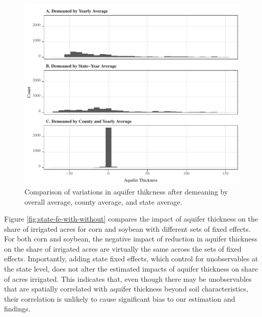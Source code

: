 \documentclass[
]{article}
\begin{document}
\begin{figure}[H]

{\centering \includegraphics[width=6in,]{Figures/g_variation} 

}

\caption{Comparison of variations in aquifer thikcness after demeaning by overall average, county average, and state average.}\label{fig:variation-left}
\end{figure}

Figure \ref{fig:state-fe-with-without} compares the impact of aquifer thickness on the share of irrigated acres for corn and soybean with different sets of fixed effects. For both corn and soybean, the negative impact of reduction in aquifer thickness on the share of irrigated acres are virtually the same across the sets of fixed effects. Importantly, adding state fixed effects, which control for unobservables at the state level, does not alter the estimated impacts of aquifer thickness on share of acres irrigated. This indicates that, even though there may be unobservables that are spatially correlated with aquifer thickness beyond soil characteristics, their correlation is unlikely to cause significant bias to our estimation and findings.
\end{document}
